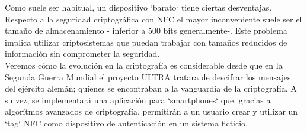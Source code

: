 \documentclass[PFC.tex]{subfiles}
\begin{document}
Como suele ser habitual, un dispositivo `barato` tiene ciertas desventajas. Respecto a la seguridad criptográfica con NFC el mayor inconveniente suele ser el tamaño de almacenamiento - inferior a 500 bits generalmente-. Este problema implica utilizar criptosistemas que puedan trabajar con tamaños reducidos de información sin comprometer la seguridad.\\

Veremos cómo la evolución en la criptografía es considerable desde que en la Segunda Guerra Mundial el proyecto ULTRA tratara de descifrar los mensajes del ejército alemán; quienes se encontraban a la vanguardia de la criptografía. A su vez, se implementará una aplicación para `smartphones` que, gracias a algorítmos avanzados de criptografía, permitirán a un usuario crear y utilizar un `tag` NFC como dispositivo de autenticación en un sistema ficticio.
\end{document}
